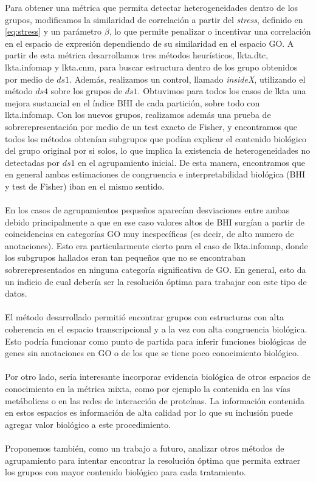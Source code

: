 Para obtener una métrica que permita detectar heterogeneidades dentro de los grupos, modificamos la similaridad de correlación a partir del \textit{stress}, definido en \ref{eq:stress} y un parámetro $\beta$, lo que permite penalizar o incentivar una correlación en el espacio de expresión dependiendo de su similaridad en el espacio GO. A partir de esta métrica desarrollamos tres métodos heurísticos, lkta.dtc, lkta.infomap y lkta.cnm, para buscar estructura dentro de los grupo obtenidos por medio de $ds1$. Además, realizamos un control, llamado \textit{insideX}, utilizando el método $ds4$ sobre los grupos de $ds1$. Obtuvimos para todos los casos de lkta una mejora sustancial en el índice BHI de cada partición, sobre todo con lkta.infomap. Con los nuevos grupos, realizamos además una prueba de sobrerepresentación por medio de un test exacto de Fisher, y encontramos que todos los métodos obtenían subgrupos que podían explicar el contenido biológico del grupo original por si solos, lo que implica la existencia de heterogeneidades no detectadas por $ds1$ en el agrupamiento inicial. De esta manera, encontramos que en general ambas estimaciones de congruencia e interpretabilidad biológica (BHI y test de Fisher) iban en el mismo sentido.\\\\
En los casos de agrupamientos pequeños aparecían desviaciones entre ambas debido principalmente a que en ese caso valores altos de BHI surgían a partir de coincidencias en categorías GO muy inespecíficas (es decir, de alto numero de anotaciones). Esto era particularmente cierto para el caso de lkta.infomap, donde los subgrupos hallados eran tan pequeños que no se encontraban sobrerepresentados en ninguna categoría significativa de GO. En general, esto da un indicio de cual debería ser la resolución óptima para trabajar con este tipo de datos.\\\\
El método desarrollado permitió encontrar grupos con estructuras con alta coherencia en el espacio transcripcional y a la vez con alta congruencia biológica. Esto podría funcionar como punto de partida para inferir funciones biológicas de genes sin anotaciones en GO o de los que se tiene poco conocimiento biológico.\\\\
Por otro lado, sería interesante incorporar evidencia biológica de otros espacios de conocimiento en la métrica mixta, como por ejemplo la contenida en las vías metábolicas o en las redes de interacción de proteínas. La información contenida en estos espacios es información de alta calidad por lo que su inclusión puede agregar valor biológico a este procedimiento.\\\\
Proponemos también, como un trabajo a futuro, analizar otros métodos de agrupamiento para intentar encontrar la resolución óptima que permita extraer los grupos con mayor contenido biológico para cada tratamiento.

